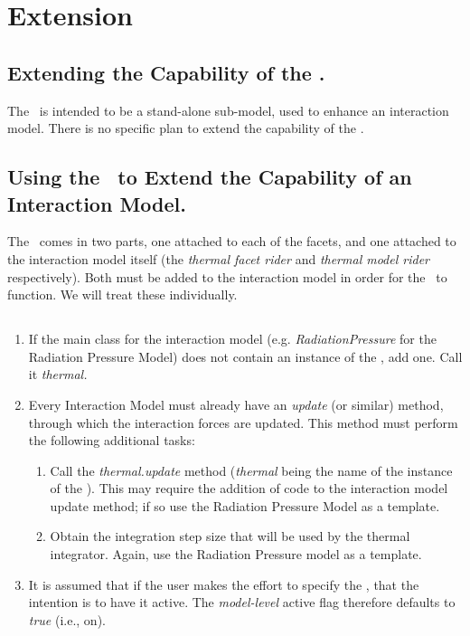 %
%
% 
%

 \section{Extension}
 \label{sec:user_extension}

\subsection{Extending the Capability of the \ThermalRiderDesc.}
The \ThermalRiderDesc\ is intended to be a stand-alone sub-model, used to enhance an interaction model.  There is no specific plan to extend the capability of the \ThermalRiderDesc.

\subsection{Using the \ThermalRiderDesc\ to Extend the Capability of an Interaction Model.}

The \ThermalRiderDesc\ comes in two parts, one attached to each of the facets, and one attached to the interaction model itself (the \textit{thermal facet rider} and \textit{thermal model rider} respectively).  Both must be added to the interaction model in order for the \ThermalRiderDesc\ to function.  We will treat these individually.

\subsection{\ThermalRiderDesc}
\begin{enumerate}
\item
If the main class for the interaction model (e.g. \textit{RadiationPressure} for the Radiation Pressure Model) does not contain an instance of the \ThermalRiderDesc, add one.  Call it \textit{thermal.}
\item
Every Interaction Model must already have an \textit{update} (or similar) method, through which the interaction forces are updated.  This method must perform the following additional tasks:
\begin{enumerate}
\item Call the \textit{thermal.update} method (\textit{thermal} being the name of the instance of the \ThermalRiderDesc).  This may require the addition of code to the interaction model update method; if so use the Radiation Pressure Model as a template. 
\item Obtain the integration step size that will be used by the thermal integrator.  Again, use the Radiation Pressure model as a template.
\end{enumerate}
\item
It is assumed that if the user makes the effort to specify the \ThermalRiderDesc, that the intention is to have it active.  The \textit{model-level} active flag therefore defaults to \textit{true} (i.e., on).
\end{enumerate}


